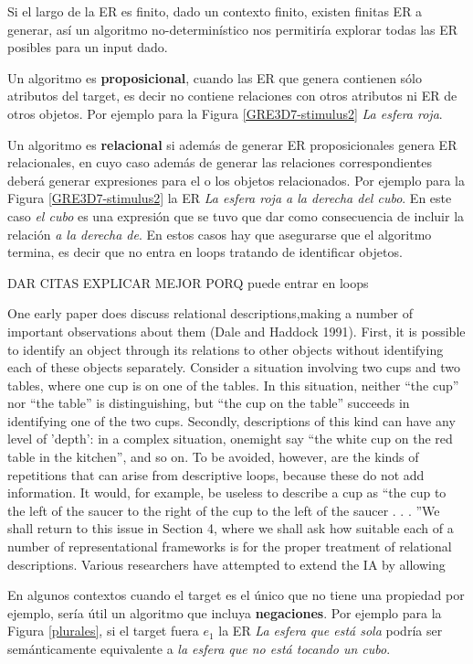 Si el largo de la ER es finito, dado un contexto finito, existen finitas ER a generar, as\'i un algoritmo no-determin\'istico nos permitir\'ia explorar todas las ER posibles para un input dado.

Un algoritmo es {\bf proposicional}, cuando las ER que genera contienen s\'olo atributos del target, es decir no contiene relaciones con otros atributos ni ER de otros objetos.  Por ejemplo para la Figura \ref{GRE3D7-stimulus2} {\it La esfera roja}.

Un algoritmo es {\bf relacional} si adem\'as de generar ER proposicionales genera ER relacionales, en cuyo caso adem\'as de generar las relaciones correspondientes deber\'a generar expresiones para el o los objetos relacionados. Por ejemplo para la Figura \ref{GRE3D7-stimulus2} la ER {\it La esfera roja a la derecha del cubo}. En este caso {\it el cubo} es una expresi\'on que se tuvo que dar como consecuencia de incluir la relaci\'on {\it a la derecha de}. En estos casos hay que asegurarse que el algoritmo termina, es decir que no entra en loops tratando de identificar objetos.


DAR CITAS EXPLICAR MEJOR PORQ puede entrar en loops

One early paper does discuss relational descriptions,making a number of important
observations about them (Dale and Haddock 1991). First, it is possible to identify an
object through its relations to other objects without identifying each of these objects
separately. Consider a situation involving two cups and two tables, where one cup is on
one of the tables. In this situation, neither ``the cup'' nor ``the table'' is distinguishing,
but ``the cup on the table'' succeeds in identifying one of the two cups. Secondly,
descriptions of this kind can have any level of 'depth': in a complex situation, onemight
say ``the white cup on the red table in the kitchen'', and so on. To be avoided, however,
are the kinds of repetitions that can arise from descriptive loops, because these do not
add information. It would, for example, be useless to describe a cup as ``the cup to the
left of the saucer to the right of the cup to the left of the saucer . . . ''We shall return to this
issue in Section 4, where we shall ask how suitable each of a number of representational
frameworks is for the proper treatment of relational descriptions.
Various researchers have attempted to extend the IA by allowing

En algunos contextos cuando el target es el \'unico que no tiene una propiedad por ejemplo, ser\'ia \'util un algoritmo que incluya {\bf negaciones}. Por ejemplo para la Figura \ref{plurales}, si el target fuera $e_1$ la ER {\it La esfera que est\'a sola} podr\'ia ser sem\'anticamente equivalente a {\it la esfera que no est\'a tocando un cubo}.

